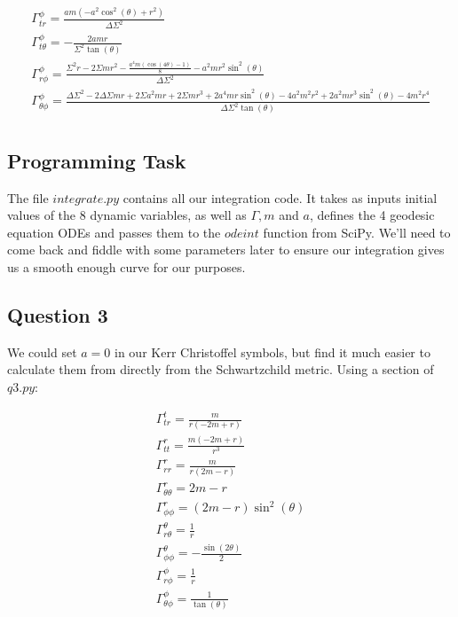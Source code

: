 \documentclass[10pt,a4paper]{report}
\begin{document}
\begin{align*}
\Gamma^\phi_{tr} = \frac{a m \left(- a^{2} \cos^{2}{\left(\theta \right)} + r^{2}\right)}{\Delta \Sigma^{2}}\\
\Gamma^\phi_{t\theta} = - \frac{2 a m r}{\Sigma^{2} \tan{\left(\theta \right)}}\\
\Gamma^\phi_{r\phi} = \frac{\Sigma^{2} r - 2 \Sigma m r^{2} - \frac{a^{4} m \left(\cos{\left(4 \theta \right)} - 1\right)}{8} - a^{2} m r^{2} \sin^{2}{\left(\theta \right)}}{\Delta \Sigma^{2}}\\
\Gamma^\phi_{\theta\phi} = \frac{\Delta \Sigma^{2} - 2 \Delta \Sigma m r + 2 \Sigma a^{2} m r + 2 \Sigma m r^{3} + 2 a^{4} m r \sin^{2}{\left(\theta \right)} - 4 a^{2} m^{2} r^{2} + 2 a^{2} m r^{3} \sin^{2}{\left(\theta \right)} - 4 m^{2} r^{4}}{\Delta \Sigma^{2} \tan{\left(\theta \right)}}\\
\end{align*}

\normalsize

\subsection*{Programming Task}

The file $integrate.py$ contains all our integration code. It takes as inputs initial values of the 8 dynamic variables, as well as $\Gamma, m$ and $a$, defines the 4 geodesic equation ODEs and passes them to the $odeint$ function from SciPy. We'll need to come back and fiddle with some parameters later to ensure our integration gives us a smooth enough curve for our purposes. 
 
\subsection*{Question 3}

We could set $a=0$ in our Kerr Christoffel symbols, but find it much easier to calculate them from directly from the Schwartzchild metric. Using a section of $q3.py$:

\small\begin{align*}
\Gamma^t_{tr} = \frac{m}{r (- 2 m + r)}\\
\Gamma^r_{tt} = \frac{m (- 2 m + r)}{r^{3}}\\
\Gamma^r_{rr} = \frac{m}{r (2 m - r)}\\
\Gamma^r_{\theta\theta} = 2 m - r\\
\Gamma^r_{\phi\phi} = (2 m - r) \sin^{2}{(\theta )}\\
\Gamma^\theta_{r\theta} = \frac{1}{r}\\
\Gamma^\theta_{\phi\phi} = - \frac{\sin{(2 \theta )}}{2}\\
\Gamma^\phi_{r\phi} = \frac{1}{r}\\
\Gamma^\phi_{\theta\phi} = \frac{1}{\tan{(\theta )}}\\
\end{align*}
\end{document}
